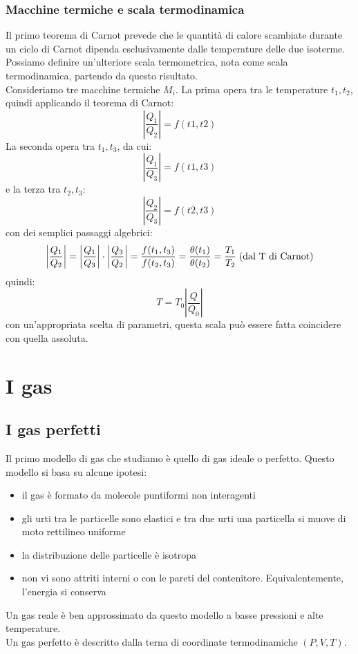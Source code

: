 \documentclass{article}
\begin{document}
\subsubsection{Macchine termiche e scala termodinamica}
Il primo teorema di Carnot prevede che le quantità di calore scambiate durante un ciclo di Carnot dipenda esclusivamente dalle temperature delle due isoterme. Possiamo definire un'ulteriore scala termometrica, nota come scala termodinamica, partendo da questo risultato.\\
Consideriamo tre macchine termiche $M_i$. La prima opera tra le temperature $t_1,t_2$, quindi applicando il teorema di Carnot:
$$ \left| \frac{Q_1}{Q_2} \right| = f(t1, t2) $$
La seconda opera tra $t_1, t_3$, da cui:
$$ \left| \frac{Q_1}{Q_3} \right| = f(t1, t3) $$
e la terza tra $t_2,t_3$:
$$ \left| \frac{Q_2}{Q_3} \right| = f(t2, t3) $$
con dei semplici passaggi algebrici:
$$ \left| \frac{Q_1}{Q_2} \right| = \left| \frac{Q_1}{Q_3} \right| \cdot \left| \frac{Q_3}{Q_2} \right| = \frac{f(t_1, t_3)}{f(t_2,t_3)} = \frac{\theta(t_1)}{\theta(t_2)} = \frac{T_1}{T_2} \text{\;(dal T di Carnot)} $$
quindi:
$$ T=T_0\left| \frac{Q}{Q_0} \right| $$
con un'appropriata scelta di parametri, questa scala può essere fatta coincidere con quella assoluta.




\newpage
\section{I gas}

\subsection{I gas perfetti}
Il primo modello di gas che studiamo è quello di gas ideale o perfetto. Questo modello si basa su alcune ipotesi:
\begin{itemize}
    \item il gas è formato da molecole puntiformi non interagenti
    \item gli urti tra le particelle sono elastici e tra due urti una particella si muove di moto rettilineo uniforme
    \item la distribuzione delle particelle è isotropa
    \item non vi sono attriti interni o con le pareti del contenitore. Equivalentemente, l'energia si conserva
\end{itemize}
Un gas reale è ben approssimato da questo modello a basse pressioni e alte temperature.\\
Un gas perfetto è descritto dalla terna di coordinate termodinamiche $(P,V,T)$.
\end{document}
